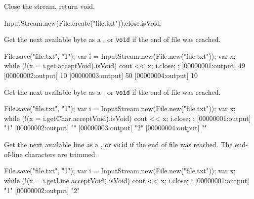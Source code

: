 \begin{urbiscriptapi}
\item[close] Close the stream, return void.
\begin{urbiassert}
InputStream.new(File.create("file.txt")).close.isVoid;
\end{urbiassert}

\item[get]
  Get the next available byte as a , or
  \lstinline|void| if the end of file was reached.
\begin{urbiscript}
{
  File.save("file.txt", "1\n");
  var i = InputStream.new(File.new("file.txt"));
  var x;
  while (!(x = i.get.acceptVoid).isVoid)
    cout << x;
  i.close;
};
[00000001:output] 49
[00000002:output] 10
[00000003:output] 50
[00000004:output] 10
\end{urbiscript}

\item[getChar]
  Get the next available byte as a , or
  \lstinline|void| if the end of file was reached.
\begin{urbiscript}
{
  File.save("file.txt", "1\n");
  var i = InputStream.new(File.new("file.txt"));
  var x;
  while (!(x = i.getChar.acceptVoid).isVoid)
    cout << x;
  i.close;
};
[00000001:output] "1"
[00000002:output] "\n"
[00000003:output] "2"
[00000004:output] "\n"
\end{urbiscript}

\item[getLine]
  Get the next available line as a , or
  \lstinline|void| if the end of file was reached.  The end-of-line
  characters are trimmed.
\begin{urbiscript}
{
  File.save("file.txt", "1\n");
  var i = InputStream.new(File.new("file.txt"));
  var x;
  while (!(x = i.getLine.acceptVoid).isVoid)
    cout << x;
  i.close;
};
[00000001:output] "1"
[00000002:output] "2"
\end{urbiscript}
\end{urbiscriptapi}


